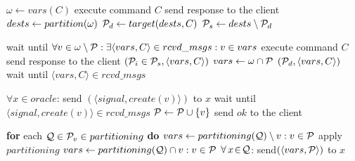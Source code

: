 \begin{algorithm}[h!]
\footnotesize

\begin{distribalgo}[1]

	\STATE $\omega \leftarrow vars(C)$
		\STATE execute command $C$
		\STATE send response to the client
		\STATE $dests \leftarrow partition(\omega)$
		\STATE $\mathcal{P}_d \leftarrow target(dests, C)$
		\STATE $\mathcal{P}_s \leftarrow dests \setminus \mathcal{P}_d$

			\STATE wait until $\forall v \in \omega \setminus \mathcal{P}: \exists \langle vars, C \rangle \in rcvd\_msgs :v \in vars$
			\STATE execute command $C$
			\STATE send response to the client
			\STATE \rmcast$(\mathcal{P}_i \in \mathcal{P}_s, \langle vars, C\rangle)$
			\STATE $vars \leftarrow \omega \cap \mathcal{P}$
			\STATE \rmcast$(\mathcal{P}_d, \langle vars, C \rangle)$
			\STATE wait until $\langle vars, C \rangle \in rcvd\_msgs$
		\ENDIF
	\ENDIF
\ENDINDENT

\vspace{1.0mm}

\vspace{1.0mm}
	\STATE $\forall x \in oracle$: send $(\langle signal, create(v) \rangle )$ to $x$
	\STATE wait until $\langle signal, create(v) \rangle \in rcvd\_msgs$
	\STATE $\mathcal{P} \leftarrow \mathcal{P} \cup \{v\}$
	\STATE send $ok$ to the client
\ENDINDENT

\vspace{1.0mm}
	\STATE \textbf{for} each $\mathcal{Q} \in \mathcal{P}_v \in partitioning$ \textbf{do}
			\STATE $vars \leftarrow partitioning(\mathcal{Q}) \setminus v:v \in \mathcal{P}$
				\STATE apply $partitioning$
			\ENDIF
		\ELSE
			\STATE $vars \leftarrow partitioning(\mathcal{Q}) \cap v:v \in \mathcal{P}$
			\STATE $\forall\,x\!\in\!\mathcal{Q}$: send$(\langle vars, \mathcal{P} \rangle )$ to $x$
		\ENDIF
\ENDINDENT


\end{distribalgo}
\end{algorithm}
